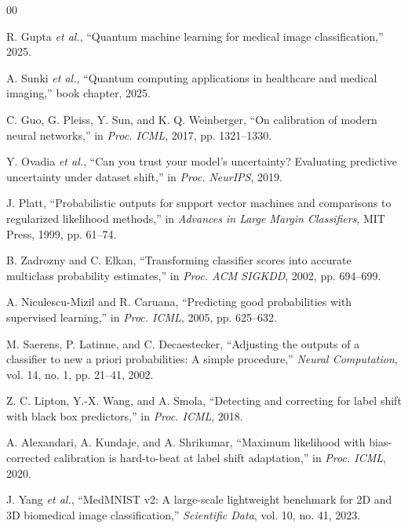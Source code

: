 \documentclass[conference]{IEEEtran}
\begin{document}
\begin{thebibliography}{00}

R. Gupta \emph{et al.}, ``Quantum machine learning for medical image classification,'' 2025.

A. Sunki \emph{et al.}, ``Quantum computing applications in healthcare and medical imaging,'' book chapter, 2025.

C. Guo, G. Pleiss, Y. Sun, and K. Q. Weinberger, ``On calibration of modern neural networks,'' in \emph{Proc. ICML}, 2017, pp. 1321--1330.

Y. Ovadia \emph{et al.}, ``Can you trust your model's uncertainty? Evaluating predictive uncertainty under dataset shift,'' in \emph{Proc. NeurIPS}, 2019.

J. Platt, ``Probabilistic outputs for support vector machines and comparisons to regularized likelihood methods,'' in \emph{Advances in Large Margin Classifiers}, MIT Press, 1999, pp. 61--74.

B. Zadrozny and C. Elkan, ``Transforming classifier scores into accurate multiclass probability estimates,'' in \emph{Proc. ACM SIGKDD}, 2002, pp. 694--699.

A. Niculescu-Mizil and R. Caruana, ``Predicting good probabilities with supervised learning,'' in \emph{Proc. ICML}, 2005, pp. 625--632.

M. Saerens, P. Latinne, and C. Decaestecker, ``Adjusting the outputs of a classifier to new a priori probabilities: A simple procedure,'' \emph{Neural Computation}, vol. 14, no. 1, pp. 21--41, 2002.

Z. C. Lipton, Y.-X. Wang, and A. Smola, ``Detecting and correcting for label shift with black box predictors,'' in \emph{Proc. ICML}, 2018.

A. Alexandari, A. Kundaje, and A. Shrikumar, ``Maximum likelihood with bias-corrected calibration is hard-to-beat at label shift adaptation,'' in \emph{Proc. ICML}, 2020.

J. Yang \emph{et al.}, ``MedMNIST v2: A large-scale lightweight benchmark for 2D and 3D biomedical image classification,'' \emph{Scientific Data}, vol. 10, no. 41, 2023.


\end{thebibliography}
\end{document}
